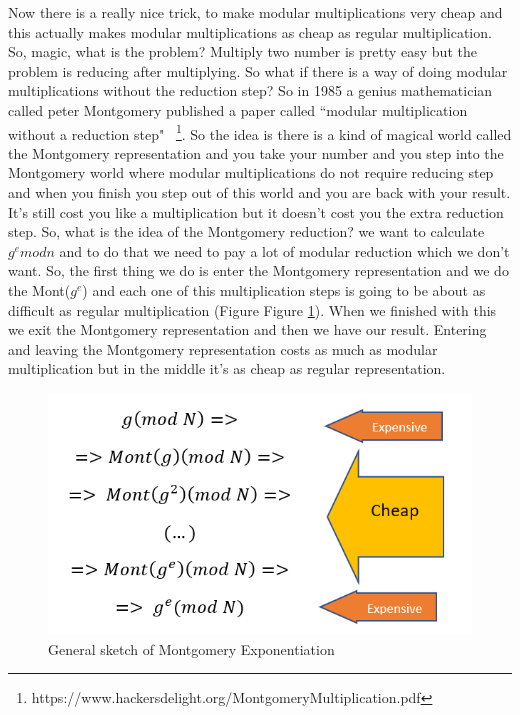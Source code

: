 Now there is a really nice trick, to make modular multiplications very cheap and
this actually makes modular multiplications as cheap as regular multiplication.
So, magic, what is the problem? Multiply two number is pretty easy but the
problem is reducing after multiplying. So what if there is a way of doing
modular multiplications without the reduction step? So in 1985 a genius
mathematician called peter Montgomery published a paper called ``modular
multiplication without a reduction step"
~\cite{warren2013hacker}\footnote{https://www.hackersdelight.org/MontgomeryMultiplication.pdf}.
So the idea is there is a kind of magical world called the Montgomery
representation and you take your number and you step into the Montgomery world
where modular multiplications do not require reducing step and when you finish
you step out of this world and you are back with your result. It's still cost
you like a multiplication but it doesn't cost you the extra reduction step. So,
what is the idea of the Montgomery reduction? we want to calculate \(g^emodn\)
and to do that we need to pay a lot of modular reduction which we  don't want.
So, the first thing we do is enter the Montgomery representation and we do the
Mont(\(g^e\)) and each one of this multiplication steps is going to be about as
difficult as regular multiplication (Figure Figure \ref{montg:fig}). When we
finished with this we exit the Montgomery representation and then we have our
result. Entering and leaving the Montgomery representation costs as much as
modular multiplication but in the middle it's as cheap as regular
representation.

\begin{figure}[!ht]
    \centering
    \includegraphics[scale=0.7]{images/chapter_3/montg.PNG}
    \caption{General sketch of Montgomery Exponentiation} \label{montg:fig}
\end{figure}

